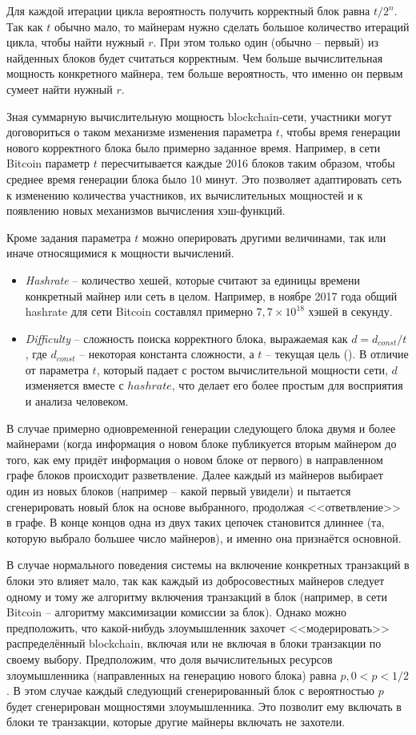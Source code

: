 Для каждой итерации цикла вероятность получить корректный блок равна $t / 2^{n}$. Так как $t$ обычно мало, то майнерам нужно сделать большое количество итераций цикла, чтобы найти нужный $r$. При этом только один (обычно -- первый) из найденных блоков будет считаться корректным. Чем больше вычислительная мощность конкретного майнера, тем больше вероятность, что именно он первым сумеет найти нужный $r$.

Зная суммарную вычислительную мощность blockchain-сети, участники могут договориться о таком механизме изменения параметра $t$, чтобы время генерации нового корректного блока было примерно заданное время. Например, в сети Bitcoin параметр $t$ пересчитывается каждые 2016 блоков таким образом, чтобы среднее время генерации блока было 10 минут. Это позволяет адаптировать сеть к изменению количества участников, их вычислительных мощностей и к появлению новых механизмов вычисления хэш-функций.

Кроме задания параметра $t$ можно оперировать другими величинами, так или иначе относящимися к мощности вычислений.
\begin{itemize}
	\item \textit{Hashrate} -- количество хешей, которые считают за единицы времени конкретный майнер или сеть в целом. Например, в ноябре 2017 года общий hashrate для сети Bitcoin составлял примерно $7,7 \times 10^{18}$ хэшей в секунду.
	\item \textit{Difficulty} -- сложность поиска корректного блока, выражаемая как $d = d_{const} / t$, где $d_{const}$ -- некоторая константа сложности, а $t$ -- текущая цель (). В отличие от параметра $t$, который падает с ростом вычислительной мощности сети, $d$ изменяется вместе с $hashrate$, что делает его более простым для восприятия и анализа человеком.
\end{itemize}

В случае примерно одновременной генерации следующего блока двумя и более майнерами (когда информация о новом блоке публикуется вторым майнером до того, как ему придёт информация о новом блоке от первого) в направленном графе блоков происходит разветвление. Далее каждый из майнеров выбирает один из новых блоков (например -- какой первый увидели) и пытается сгенерировать новый блок на основе выбранного, продолжая <<ответвление>> в графе. В конце концов одна из двух таких цепочек становится длиннее (та, которую выбрало большее число майнеров), и именно она признаётся основной.

В случае нормального поведения системы на включение конкретных транзакций в блоки это влияет мало, так как каждый из добросовестных майнеров следует одному и тому же алгоритму включения транзакций в блок (например, в сети Bitcoin -- алгоритму максимизации комиссии за блок). Однако можно предположить, что какой-нибудь злоумышленник захочет <<модерировать>> распределённый blockchain, включая или не включая в блоки транзакции по своему выбору. Предположим, что доля вычислительных ресурсов злоумышленника (направленных на генерацию нового блока) равна $p, 0 < p < 1/2$. В этом случае каждый следующий сгенерированный блок с вероятностью $p$ будет сгенерирован мощностями злоумышленника. Это позволит ему включать в блоки те транзакции, которые другие майнеры включать не захотели.

